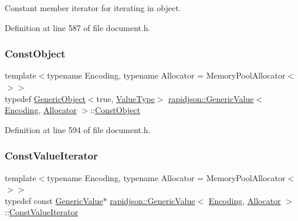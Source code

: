 Constant member iterator for iterating in object. 



Definition at line 587 of file document.\+h.

\mbox{\label{classrapidjson_1_1_generic_value_a39f5e1993897a86741b55c32ed4f54ef}} 
\subsubsection{\texorpdfstring{ConstObject}{ConstObject}}
{\footnotesize\ttfamily template$<$typename Encoding, typename Allocator = Memory\+Pool\+Allocator$<$$>$$>$ \\
typedef \mbox{\hyperlink{classrapidjson_1_1_generic_object}{Generic\+Object}}$<$true, \mbox{\hyperlink{classrapidjson_1_1_generic_value_ad2935191ab28c2c2e472b739a9d58202}{Value\+Type}}$>$ \mbox{\hyperlink{classrapidjson_1_1_generic_value}{rapidjson\+::\+Generic\+Value}}$<$ \mbox{\hyperlink{classrapidjson_1_1_encoding}{Encoding}}, \mbox{\hyperlink{classrapidjson_1_1_allocator}{Allocator}} $>$\+::\mbox{\hyperlink{classrapidjson_1_1_generic_value_a39f5e1993897a86741b55c32ed4f54ef}{Const\+Object}}}



Definition at line 594 of file document.\+h.

\mbox{\label{classrapidjson_1_1_generic_value_a89a6588121742fc3f154b10b8f15f45f}} 
\subsubsection{\texorpdfstring{ConstValueIterator}{ConstValueIterator}}
{\footnotesize\ttfamily template$<$typename Encoding, typename Allocator = Memory\+Pool\+Allocator$<$$>$$>$ \\
typedef const \mbox{\hyperlink{classrapidjson_1_1_generic_value}{Generic\+Value}}$\ast$ \mbox{\hyperlink{classrapidjson_1_1_generic_value}{rapidjson\+::\+Generic\+Value}}$<$ \mbox{\hyperlink{classrapidjson_1_1_encoding}{Encoding}}, \mbox{\hyperlink{classrapidjson_1_1_allocator}{Allocator}} $>$\+::\mbox{\hyperlink{classrapidjson_1_1_generic_value_a89a6588121742fc3f154b10b8f15f45f}{Const\+Value\+Iterator}}}



